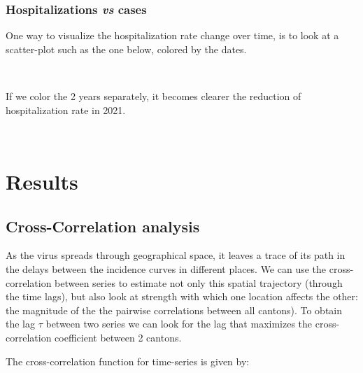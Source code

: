 \documentclass[11pt]{article}
\begin{document}
    \hypertarget{hospitalizations-vs-cases}{%
\subsubsection{\texorpdfstring{Hospitalizations \emph{vs}
cases}{Hospitalizations vs cases}}\label{hospitalizations-vs-cases}}

One way to visualize the hospitalization rate change over time, is to
look at a scatter-plot such as the one below, colored by the dates.

    \begin{center}
    \end{center}
    { \hspace*{\fill} \\}
    
    If we color the 2 years separately, it becomes clearer the reduction of
hospitalization rate in 2021.

    \begin{center}
    \end{center}
    { \hspace*{\fill} \\}

\section{Results}
    
    \hypertarget{cross-correlation-analysis}{%
\subsection{Cross-Correlation analysis}\label{s:cross-correlation-analysis}}

As the virus spreads through geographical space, it leaves a trace of
its path in the delays between the incidence curves in different places.
We can use the cross-correlation between series to estimate not only
this spatial trajectory (through the time lags), but also look at
strength with which one location affects the other: the magnitude of the
the pairwise correlations between all cantons). To obtain the lag
\(\tau\) between two series we can look for the lag that maximizes the
cross-correlation coefficient between 2 cantons.

The cross-correlation function for time-series is given by:
\end{document}
